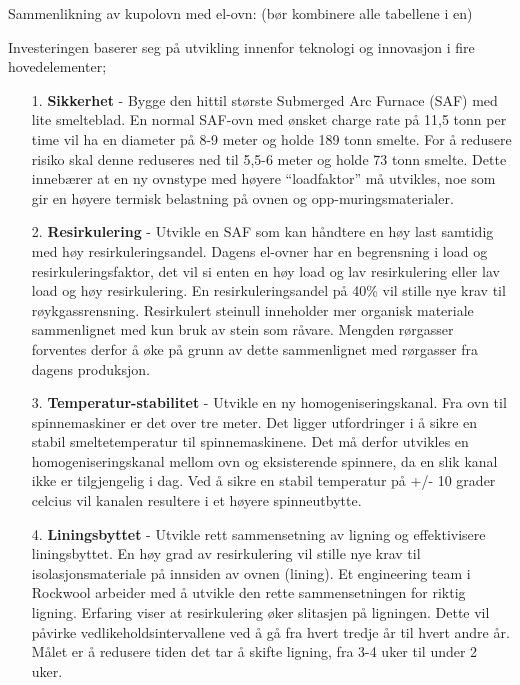 \indent \newline
Sammenlikning av kupolovn med el-ovn: (bør kombinere alle tabellene i en)

\indent \newline
Investeringen baserer seg på utvikling innenfor teknologi og innovasjon i fire hovedelementer;

\begin{itemize}
\item[1.] \textbf{Sikkerhet} - Bygge den hittil største Submerged Arc Furnace (SAF) med lite smelteblad. En normal SAF-ovn med ønsket charge rate på 11,5 tonn per time vil ha en diameter på 8-9 meter og holde 189 tonn smelte. For å redusere risiko skal denne reduseres ned til 5,5-6 meter og holde 73 tonn smelte. Dette innebærer at en ny ovnstype med høyere “loadfaktor” må utvikles, noe som gir en høyere termisk belastning på ovnen og opp-muringsmaterialer.

\item[2.] \textbf{Resirkulering} - Utvikle en SAF som kan håndtere en høy last samtidig med høy resirkuleringsandel. Dagens el-ovner har en begrensning i load og resirkuleringsfaktor, det vil si enten en høy load og lav resirkulering eller lav load og høy resirkulering. En resirkuleringsandel på 40\% vil stille nye krav til røykgassrensning. Resirkulert steinull inneholder mer organisk materiale sammenlignet med kun bruk av stein som råvare. Mengden rørgasser forventes derfor å øke på grunn av dette sammenlignet med rørgasser fra dagens produksjon.

\item[3.] \textbf{Temperatur-stabilitet} - Utvikle en ny homogeniseringskanal. Fra ovn til spinnemaskiner er det over tre meter. Det ligger utfordringer i å sikre en stabil smeltetemperatur til spinnemaskinene. Det må derfor utvikles en homogeniseringskanal mellom ovn og eksisterende spinnere, da en slik kanal ikke er tilgjengelig i dag. Ved å sikre en stabil temperatur på +/- 10 grader celcius vil kanalen resultere i et høyere spinneutbytte.

\item[4.] \textbf{Liningsbyttet} - Utvikle rett sammensetning av ligning og effektivisere liningsbyttet. En høy grad av resirkulering vil stille nye krav til isolasjonsmateriale på innsiden av ovnen (lining). Et engineering team i Rockwool arbeider med å utvikle den rette sammensetningen for riktig ligning. Erfaring viser at resirkulering øker slitasjen på ligningen. Dette vil påvirke vedlikeholdsintervallene ved å gå fra hvert tredje år til hvert andre år. Målet er å redusere tiden det tar å skifte ligning, fra 3-4 uker til under 2 uker.
\end{itemize}
 
